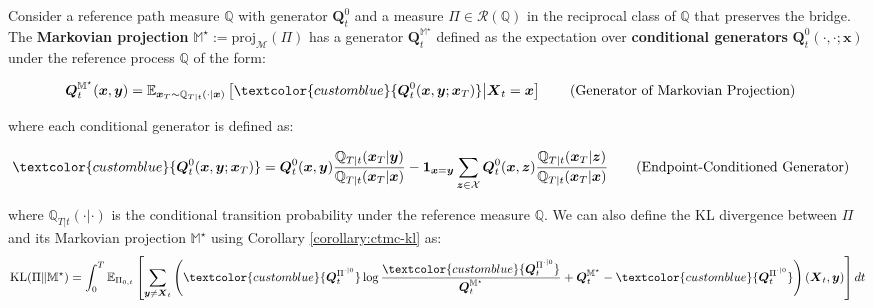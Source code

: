 \documentclass{article}
\newcommand{\bluetext}[1]{\textcolor{customblue}{#1}}
\begin{document}
\begin{definition}\label{def:ctmc-markov-proj}
    Consider a reference path measure $\mathbb{Q}$ with generator $\boldsymbol{Q}^0_t$ and a measure $\Pi\in \mathcal{R}(\mathbb{Q})$ in the reciprocal class of $\mathbb{Q}$ that preserves the bridge. The \textbf{Markovian projection} $\mathbb{M}^\star:=\text{proj}_{\mathcal{M}}(\Pi)$ has a generator $\boldsymbol{Q}^{\mathbb{M}^\star}_t$ defined as the expectation over \textbf{conditional generators} $\boldsymbol{Q}^0_t(\cdot, \cdot;\boldsymbol{x})$ under the reference process $\mathbb{Q}$ of the form:
    \begin{small}
    \begin{align}
        \boldsymbol{Q}^{\mathbb{M}^\star}_t(\boldsymbol{x},\boldsymbol{y})&=\mathbb{E}_{\boldsymbol{x}_T\sim \mathbb{Q}_{T|t}(\cdot|\boldsymbol{x})}\left[\bluetext{\boldsymbol{Q}^0_t(\boldsymbol{x},\boldsymbol{y}; \boldsymbol{x}_T)}\big|\boldsymbol{X}_t=\boldsymbol{x}\right]\tag{Generator of Markovian Projection}\label{eq:ctmc-markov-projection-generator}
    \end{align}
    \end{small}
    where each conditional generator is defined as:
    \begin{small}
    \begin{align}
        \bluetext{\boldsymbol{Q}^0_t(\boldsymbol{x},\boldsymbol{y}; \boldsymbol{x}_T)}&=\boldsymbol{Q}^0_t(\boldsymbol{x}, \boldsymbol{y})\frac{\mathbb{Q}_{T|t}(\boldsymbol{x}_T| \boldsymbol{y})}{\mathbb{Q}_{T|t}(\boldsymbol{x}_T| \boldsymbol{x})}-\boldsymbol{1}_{\boldsymbol{x}=\boldsymbol{y}}\sum_{\boldsymbol{z}\in \mathcal{X}}\boldsymbol{Q}^0_t(\boldsymbol{x}, \boldsymbol{z})\frac{\mathbb{Q}_{T|t}(\boldsymbol{x}_T| \boldsymbol{z})}{\mathbb{Q}_{T|t}(\boldsymbol{x}_T| \boldsymbol{x})}\tag{Endpoint-Conditioned Generator}\label{eq:ctmc-endpoint-cond-gen}
    \end{align}
    \end{small}
    where $\mathbb{Q}_{T|t}(\cdot|\cdot)$ is the conditional transition probability under the reference measure $\mathbb{Q}$. We can also define the KL divergence between $\Pi$ and its Markovian projection $\mathbb{M}^\star$ using Corollary \ref{corollary:ctmc-kl} as:
    \begin{align}
        \text{KL}(\Pi\|\mathbb{M}^\star)=\int_0^T\mathbb{E}_{\Pi_{0,t}}\left[\sum_{\boldsymbol{y}\neq \boldsymbol{X}_t}\left(\bluetext{\boldsymbol{Q}_t^{\Pi^{\cdot|0}}}\log \frac{\bluetext{\boldsymbol{Q}_t^{\Pi^{\cdot|0}}}}{\boldsymbol{Q}_t^{\mathbb{M}^\star}}+\boldsymbol{Q}_t^{\mathbb{M}^\star}-\bluetext{\boldsymbol{Q}_t^{\Pi^{\cdot|0}}}\right)(\boldsymbol{X}_t,\boldsymbol{y})\right]dt\label{eq:ctmc-markov-kl}

\end{align}
\end{definition}
\end{document}
